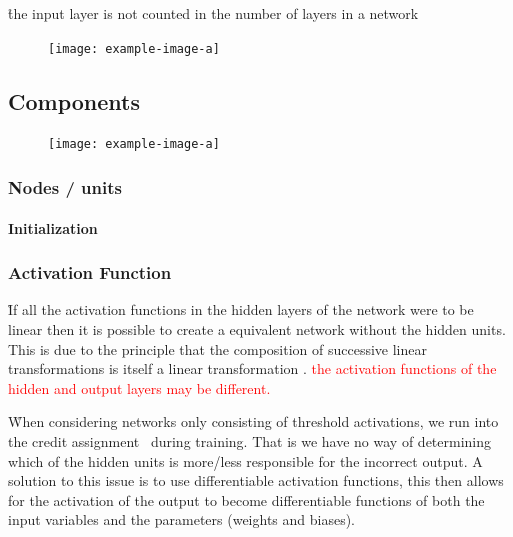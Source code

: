 \r{the input layer is not counted in the number of layers in a network}

\begin{figure}[htp]
	\centering
	\texttt{[image: example-image-a]}\hfil
	\caption{}
	\label{fig:foundations_ann_overview}
\end{figure}


\subsection{Components}

\begin{figure}[htp]
	\centering
	\texttt{[image: example-image-a]}\hfil
	\caption{}
	\label{fig:foundations_ann_overview}
\end{figure}


\subsubsection{Nodes / units}

\paragraph{Initialization}



\subsubsection{Activation Function}


\r{If all the activation functions in the hidden layers of the network were to be linear then it is possible to create a equivalent network without the hidden units. This is due to the principle that the composition of successive linear transformations is itself a linear transformation . \textcolor{red}{the activation functions of the hidden and output layers may be different.}}


\r{When considering networks only consisting of threshold activations, we run into the {credit assignment}~ during training. That is we have no way of determining which of the hidden units is more/less responsible for the incorrect output.  A solution to this issue is to use differentiable activation functions, this then allows for the activation of the output to become differentiable functions of both the input variables and the parameters (weights and biases).}

